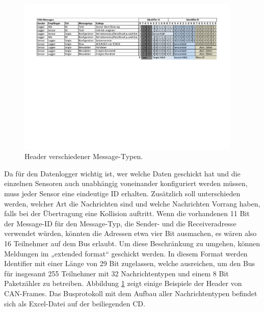 \begin{figure}
	\centering
		\includegraphics[width=0.95\textwidth]{images/canmess.pdf}
	\caption{Header verschiedener Message-Typen.}
	\label{fig.canmess}
\end{figure}

Da für den Datenlogger wichtig ist, wer welche Daten geschickt hat und die einzelnen Sensoren auch unabhängig voneinander konfiguriert werden müssen, muss jeder Sensor eine eindeutige ID erhalten. Zusätzlich soll unterschieden werden, welcher Art die Nachrichten sind und welche Nachrichten Vorrang haben, falls bei der Übertragung eine Kollision auftritt. Wenn die vorhandenen 11 Bit der Message-ID für den Message-Typ, die Sender- und die Receiveradresse verwendet würden, könnten die Adressen etwa vier Bit ausmachen, es wären also 16 Teilnehmer auf dem Bus erlaubt. Um diese Beschränkung zu umgehen, können Meldungen im „extended format“ geschickt werden. In diesem Format werden Identifier mit einer Länge von 29 Bit zugelassen, welche ausreichen, um den Bus für insgesamt 255 Teilnehmer mit 32 Nachrichtentypen und einem 8 Bit Paketzähler zu  betreiben. Abbildung \ref{fig.canmess} zeigt einige Beispiele der Header von CAN-Frames. Das Busprotokoll mit dem Aufbau aller Nachrichtentypen befindet sich als Excel-Datei auf der beiliegenden CD.

